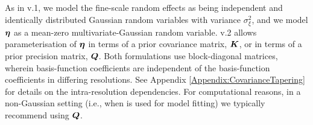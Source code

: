 \documentclass[article]{jss}
\def\mbf#1{{%
\mathchoice%
{\hbox{\boldmath$\displaystyle{#1}$}}%
{\hbox{\boldmath$\textstyle{#1}$}}%
{\hbox{\boldmath$\scriptstyle{#1}$}}%
{\hbox{\boldmath$\scriptscriptstyle{#1}$}}%
}}
\def\vec{\mbf}
\begin{document}



As in  v.1, we model the fine-scale random effects as being independent and identically distributed Gaussian random variables with variance $\sigma^2_\xi$, and we model $\vec{\eta}$ as a mean-zero multivariate-Gaussian random variable. 
  v.2 allows parameterisation of $\vec{\eta}$ in terms of a prior covariance matrix, $\vec{K}$, or in terms of a prior precision matrix, $\vec{Q}$. 
 Both formulations use block-diagonal matrices, wherein basis-function coefficients are independent of the basis-function coefficients in differing resolutions. See Appendix \ref{Appendix:CovarianceTapering} for details on the intra-resolution dependencies. 
  For computational reasons, 
  in a non-Gaussian setting (i.e., when  is used for model fitting) 
  we typically recommend using $\vec{Q}$. 

 
\end{document}
